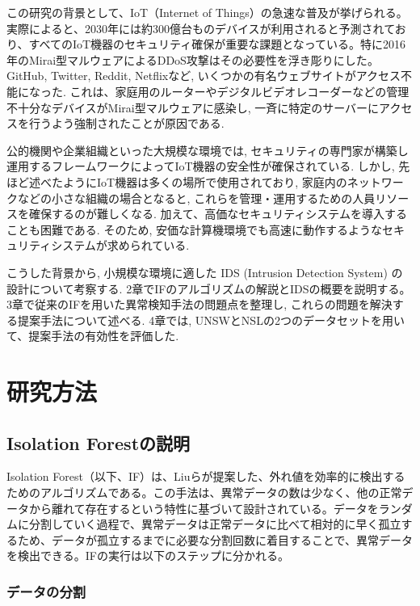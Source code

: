 \documentclass{css}
\begin{document}
この研究の背景として、IoT（Internet of Things）の急速な普及が挙げられる。実際によると、2030年には約300億台ものデバイスが利用されると予測されており\cite{Vailshery2022}、すべてのIoT機器のセキュリティ確保が重要な課題となっている。特に2016年のMirai型マルウェアによるDDoS攻撃はその必要性を浮き彫りにした\cite{8115504}。GitHub, Twitter, Reddit, Netflixなど, いくつかの有名ウェブサイトがアクセス不能になった. これは、家庭用のルーターやデジタルビデオレコーダーなどの管理不十分なデバイスがMirai型マルウェアに感染し, 一斉に特定のサーバーにアクセスを行うよう強制されたことが原因である.

公的機関や企業組織といった大規模な環境では, セキュリティの専門家が構築し運用するフレームワークによってIoT機器の安全性が確保されている. しかし, 先ほど述べたようにIoT機器は多くの場所で使用されており, 家庭内のネットワークなどの小さな組織の場合となると, これらを管理・運用するための人員リソースを確保するのが難しくなる. 加えて、高価なセキュリティシステムを導入することも困難である. そのため, 安価な計算機環境でも高速に動作するようなセキュリティシステムが求められている.

こうした背景から, 小規模な環境に適した IDS (Intrusion Detection System) の設計について考察する. 2章でIFのアルゴリズムの解説とIDSの概要を説明する。3章で従来のIFを用いた異常検知手法の問題点を整理し, これらの問題を解決する提案手法について述べる. 4章では, UNSWとNSLの2つのデータセットを用いて、提案手法の有効性を評価した.

\section{研究方法}

\subsection{Isolation Forestの説明}

Isolation Forest（以下、IF）は、Liuらが提案した\cite{Liu2008-bc}、外れ値を効率的に検出するためのアルゴリズムである。この手法は、異常データの数は少なく、他の正常データから離れて存在するという特性に基づいて設計されている。データをランダムに分割していく過程で、異常データは正常データに比べて相対的に早く孤立するため、データが孤立するまでに必要な分割回数に着目することで、異常データを検出できる。IFの実行は以下のステップに分かれる。

\subsubsection{データの分割}
\end{document}
